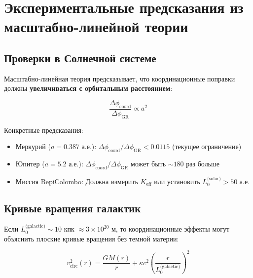 \documentclass[11pt,a4paper]{article}
\begin{document}
	
	\section{Экспериментальные предсказания из масштабно-линейной теории}
	\label{sec:scale-predictions}
	
	\subsection{Проверки в Солнечной системе}
	
	Масштабно-линейная теория предсказывает, что координационные поправки должны 
	\textbf{увеличиваться с орбитальным расстоянием}:
	
	\begin{equation}
		\frac{\Delta\phi_{\text{coord}}}{\Delta\phi_{\text{GR}}} \propto a^2
	\end{equation}
	
	Конкретные предсказания:
	\begin{itemize}
		\item Меркурий ($a = 0.387$ а.е.): $\Delta\phi_{\text{coord}}/\Delta\phi_{\text{GR}} < 0.0115$ (текущее ограничение)
		\item Юпитер ($a = 5.2$ а.е.): $\Delta\phi_{\text{coord}}/\Delta\phi_{\text{GR}}$ может быть $\sim 180$ раз больше
		\item Миссия BepiColombo: Должна измерить $K_{\mathrm{eff}}$ или установить $L_0^{\text{(solar)}} > 50$ а.е.
	\end{itemize}
	
	\subsection{Кривые вращения галактик}
	
	Если $L_0^{\text{(galactic)}} \sim 10$ кпк $\approx 3\times10^{20}$ м, то 
	координационные эффекты могут объяснить плоские кривые вращения без темной материи:
	
	\begin{equation}
		v_{\text{circ}}^2(r) = \frac{GM(r)}{r} + \kappa c^2 \left(\frac{r}{L_0^{\text{(galactic)}}}\right)^2
	\end{equation}
	
\end{document}
